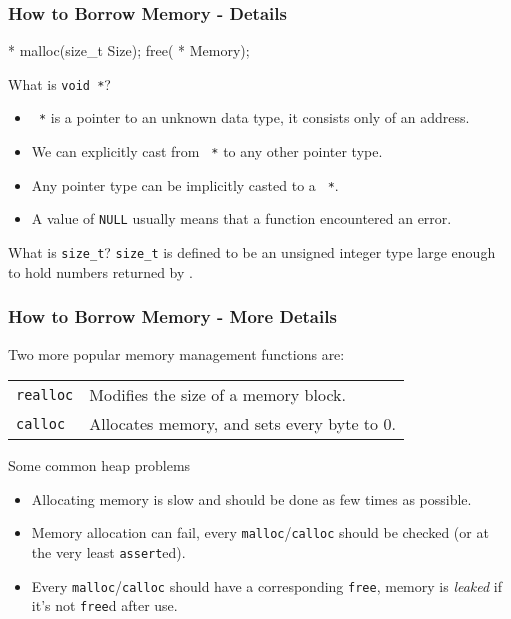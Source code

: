 \documentclass[smaller,table]{beamer} %
\begin{document}
\begin{frame}[fragile]
\frametitle{How to Borrow Memory - Details}
\begin{semiverbatim}
       * malloc(size_t Size);
       free( * Memory);
\end{semiverbatim}
\begin{block}{What is {\tt void *}?}
\begin{itemize}
\item {\tt {} *} is a pointer to an unknown data type, it consists only of an address.
\item We can explicitly cast from {\tt {} *} to any other pointer type.
\item Any pointer type can be implicitly casted to a {\tt {} *}.
\item A value of {\tt NULL} usually means that a function encountered an error.
\end{itemize}
\end{block}

\begin{block}{What is {\tt size\_t}?}
{\tt size\_t} is defined to be an unsigned integer type large enough to hold numbers returned by {\tt {}}.
\end{block}
\end{frame}

\begin{frame}
\frametitle{How to Borrow Memory - More Details}
Two more popular memory management functions are:
\begin{center}
\begin{tabular}{l l}
\tt realloc&Modifies the size of a memory block.\\
\tt calloc&Allocates memory, and sets every byte to 0.\\
\end{tabular}
\end{center}
\begin{alertblock}{Some common heap problems}
\begin{itemize}
\item Allocating memory is slow and should be done as few times as possible.
\item Memory allocation can fail, every {\tt malloc}/{\tt calloc} should be checked (or at the very least {\tt assert}ed).
\item Every {\tt malloc}/{\tt calloc} should have a corresponding {\tt free}, memory is \emph{leaked} if it's not {\tt free}d after use.
\end{itemize}
\end{alertblock}
\end{frame}
\end{document}
